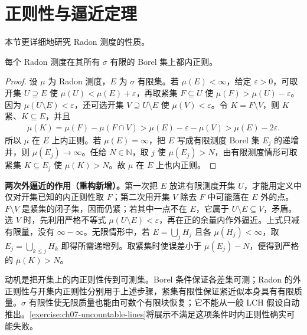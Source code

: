 \documentclass[../../main.tex]{subfiles}
\begin{document}
\section{正则性与逼近定理}\label{section:ch07-regularity-approximation}\label{section:ch07-lp-regular-borel}
本节更详细地研究 Radon 测度的性质。

\begin{proposition}\label{proposition:ch07-sigma-finite-inner}
每个 Radon 测度在其所有 $\sigma$ 有限的 Borel 集上都内正则。
\end{proposition}
\begin{proof}
设 $\mu$ 为 Radon 测度，$E$ 为 $\sigma$ 有限集。若 $\mu(E)<\infty$，给定 $\varepsilon>0$，可取开集 $U\supseteq E$ 使 $\mu(U)<\mu(E)+\varepsilon$，再取紧集 $F\subseteq U$ 使 $\mu(F)>\mu(U)-\varepsilon$。因为 $\mu(U\setminus E)<\varepsilon$，还可选开集 $V\supseteq U\setminus E$ 使 $\mu(V)<\varepsilon$。令 $K=F\setminus V$，则 $K$ 紧、$K\subseteq E$，并且
\begin{align*}
\mu(K)=\mu(F)-\mu(F\cap V)>\mu(E)-\varepsilon-\mu(V)>\mu(E)-2\varepsilon.
\end{align*}
所以 $\mu$ 在 $E$ 上内正则。若 $\mu(E)=\infty$，把 $E$ 写成有限测度 Borel 集 $E_j$ 的递增并，则 $\mu(E_j)\to\infty$。任给 $N\in\mathbb N$，取 $j$ 使 $\mu(E_j)>N$，由有限测度情形可取紧集 $K\subseteq E_j$ 使 $\mu(K)>N$。故 $\mu$ 在 $E$ 上也内正则。
\end{proof}
\begin{remark}
\textbf{两次外逼近的作用（重构新增）。}第一次把 $E$ 放进有限测度开集 $U$，才能用定义中仅对开集已知的内正则性取 $F$；第二次用开集 $V$ 除去 $F$ 中可能落在 $E$ 外的点。$F\setminus V$ 是紧集的闭子集，因而仍紧；若其中一点不在 $E$，它属于 $U\setminus E\subseteq V$，矛盾。选 $V$ 时，先利用严格不等式 $\mu(U\setminus E)<\varepsilon$，再在正的余量内作外逼近。上式只减有限量，没有 $\infty-\infty$。无限情形中，若 $E=\bigcup_j H_j$ 且各 $\mu(H_j)<\infty$，取 $E_j=\bigcup_{k\leqslant j}H_k$ 即得所需递增列。取紧集时使误差小于 $\mu(E_j)-N$，便得到严格的 $\mu(K)>N$。

动机是把开集上的内正则性传到可测集。Borel 条件保证各差集可测；Radon 的外正则性与开集内正则性分别用于上述步骤，紧集有限性保证紧近似本身具有有限质量。$\sigma$ 有限性使无限质量也能由可数个有限块恢复；它不能从一般 LCH 假设自动推出。\cref{exercise:ch07-uncountable-lines}将展示不满足这项条件时内正则性确实可能失败。
\end{remark}
\end{document}
